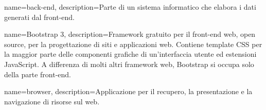 \hypertarget{B}{}

{
	name=back-end,
	description={Parte di un sistema informatico che elabora i dati generati dal front-end.}
}

{
	name=Bootstrap 3,
	description={Framework gratuito per il front-end web, open source, per la progettazione di siti e applicazioni web. Contiene template CSS per la maggior parte delle componenti grafiche di un'interfaccia utente ed estensioni JavaScript. A differenza di molti altri framework web, Bootstrap si occupa solo della parte front-end.}
}

{
	name=browser,
	description={Applicazione per il recupero, la presentazione e la navigazione di risorse sul web.}
}